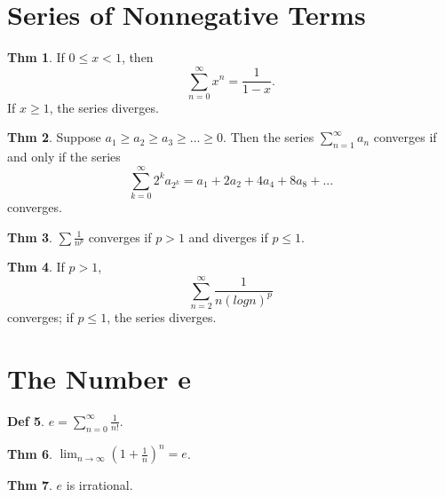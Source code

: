 \documentclass{article}
\theoremstyle{definition}
\newtheorem{definition}{Def}
\newtheorem{theorem}[definition]{Thm}
\begin{document}
\section{Series of Nonnegative Terms}
\begin{theorem}
    If $0\leq x<1$, then
    \[
    \sum_{n=0}^\infty x^n=\frac{1}{1-x}.
    \]
    If $x\geq1$, the series diverges.
\end{theorem}
\begin{theorem}
    Suppose $a_1\geq a_2\geq a_3\geq ... \geq 0$. Then the series $\sum_{n=1}^\infty a_n$ converges if and only if the series
    \[
    \sum_{k=0}^\infty 2^ka_{2^k}=a_1+2a_2+4a_4+8a_8+...
    \]
    converges.
\end{theorem}
\begin{theorem}
    $\sum \frac{1}{n^p}$ converges if $p>1$ and diverges if $p\leq1$.
\end{theorem}
\begin{theorem}
    If $p>1$,
    \[
    \sum_{n=2}^\infty \frac{1}{n(logn)^p}
    \]
    converges; if $p \leq1$, the series diverges.
\end{theorem}

\section{The Number e}
\begin{definition}
    $e=\sum_{n=0}^\infty \frac{1}{n!}$.
\end{definition}
\begin{theorem}
    $\lim_{n\to\infty}(1+\frac{1}{n})^n=e$.
\end{theorem}
\begin{theorem}
    $e$ is irrational.
\end{theorem}
\end{document}

